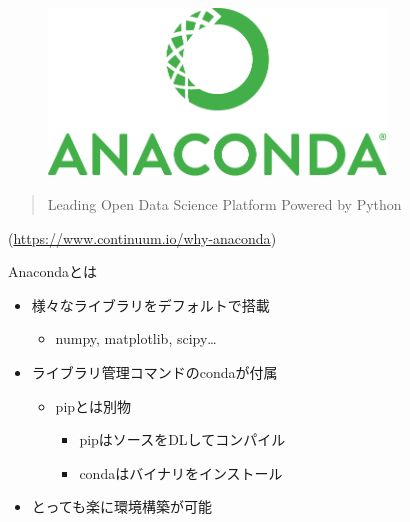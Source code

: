 \documentclass[12pt, dvipdfmx]{beamer}
\begin{document}
\begin{frame}
    \begin{figure}[htbp]
        \centering
        \includegraphics[width=0.8\textwidth]{img/anacondalogo.pdf}
    \end{figure}
    \begin{quote}
        Leading Open Data Science Platform Powered by Python
    \end{quote}
    \begin{flushright}
        (\url{https://www.continuum.io/why-anaconda})
    \end{flushright}
\end{frame}
\begin{frame}{Anacondaとは}
    \begin{itemize}
        \item 様々なライブラリをデフォルトで搭載
        \begin{itemize}
            \item numpy, matplotlib, scipy…
        \end{itemize}
        \item ライブラリ管理コマンドのcondaが付属
        \begin{itemize}
            \item pipとは別物
            \begin{itemize}
                \item pipはソースをDLしてコンパイル
                \item condaはバイナリをインストール
            \end{itemize}
        \end{itemize}
        \item<2|alert@2> とっても楽に環境構築が可能
    \end{itemize}
\end{frame}
\end{document}

